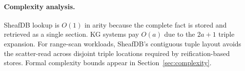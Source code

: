 \paragraph{Complexity analysis.}
SheafDB lookup is $O(1)$ in arity because the complete fact is stored and retrieved as a single section. KG systems pay $O(a)$ due to the $2a+1$ triple expansion. For range-scan workloads, SheafDB's contiguous tuple layout avoids the scatter-read across disjoint triple locations required by reification-based stores. Formal complexity bounds appear in Section~\ref{sec:complexity}.

\endinput
